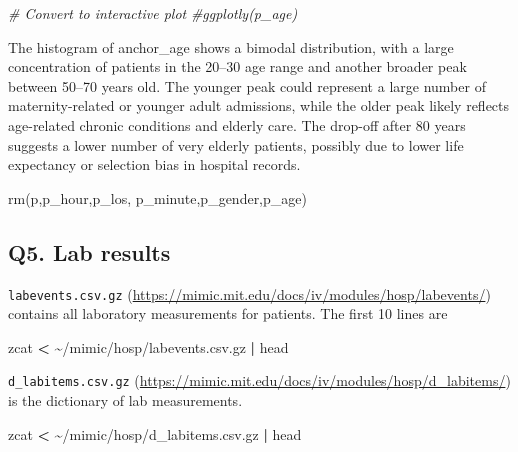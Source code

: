 \documentclass[
]{article}
\newenvironment{Shaded}{\begin{snugshade}}{\end{snugshade}}
\newcommand{\CommentTok}[1]{\textcolor[rgb]{0.56,0.35,0.01}{\textit{#1}}}
\newcommand{\FunctionTok}[1]{\textcolor[rgb]{0.00,0.00,0.00}{#1}}
\newcommand{\KeywordTok}[1]{\textcolor[rgb]{0.13,0.29,0.53}{\textbf{#1}}}
\newcommand{\NormalTok}[1]{\textcolor[rgb]{0.00,0.00,0.00}{#1}}
\newcommand{\OperatorTok}[1]{\textcolor[rgb]{0.81,0.36,0.00}{\textbf{#1}}}
\begin{document}
\begin{Shaded}
\begin{Highlighting}[]
\CommentTok{\# Convert to interactive plot}
\CommentTok{\#ggplotly(p\_age)}
\end{Highlighting}
\end{Shaded}

The histogram of anchor\_age shows a bimodal distribution, with a large
concentration of patients in the 20--30 age range and another broader
peak between 50--70 years old. The younger peak could represent a large
number of maternity-related or younger adult admissions, while the older
peak likely reflects age-related chronic conditions and elderly care.
The drop-off after 80 years suggests a lower number of very elderly
patients, possibly due to lower life expectancy or selection bias in
hospital records.

\begin{Shaded}
\begin{Highlighting}[]
\FunctionTok{rm}\NormalTok{(p,p\_hour,p\_los,}
\NormalTok{   p\_minute,p\_gender,p\_age)}
\end{Highlighting}
\end{Shaded}

\hypertarget{q5.-lab-results}{%
\subsection{Q5. Lab results}\label{q5.-lab-results}}

\texttt{labevents.csv.gz}
(\url{https://mimic.mit.edu/docs/iv/modules/hosp/labevents/}) contains
all laboratory measurements for patients. The first 10 lines are

\begin{Shaded}
\begin{Highlighting}[]
\FunctionTok{zcat} \OperatorTok{\textless{}}\NormalTok{ \textasciitilde{}/mimic/hosp/labevents.csv.gz }\KeywordTok{|} \FunctionTok{head}
\end{Highlighting}
\end{Shaded}

\texttt{d\_labitems.csv.gz}
(\url{https://mimic.mit.edu/docs/iv/modules/hosp/d_labitems/}) is the
dictionary of lab measurements.

\begin{Shaded}
\begin{Highlighting}[]
\FunctionTok{zcat} \OperatorTok{\textless{}}\NormalTok{ \textasciitilde{}/mimic/hosp/d\_labitems.csv.gz }\KeywordTok{|} \FunctionTok{head}
\end{Highlighting}
\end{Shaded}
\end{document}
